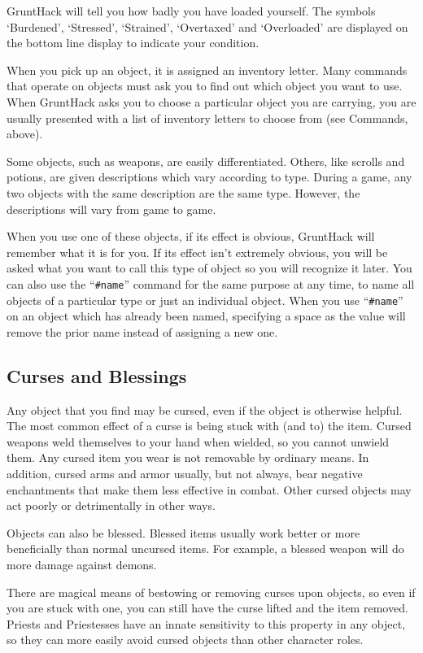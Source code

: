 GruntHack will tell you how badly you have loaded yourself.  The symbols
`Burdened', `Stressed', `Strained', `Overtaxed' and `Overloaded' are
displayed on the bottom line display to indicate your condition.

When you pick up an object, it is assigned an inventory letter.  Many
commands that operate on objects must ask you to find out which object
you want to use.  When GruntHack asks you to choose a particular object
you are carrying, you are usually presented with a list of inventory
letters to choose from (see Commands, above).

Some objects, such as weapons, are easily differentiated.  Others, like
scrolls and potions, are given descriptions which vary according to
type.  During a game, any two objects with the same description are
the same type.  However, the descriptions will vary from game to game.

When you use one of these objects, if its effect is obvious, GruntHack
will remember what it is for you.  If its effect isn't extremely
obvious, you will be asked what you want to call this type of object
so you will recognize it later.  You can also use the ``{\tt \#name}''
command for the same purpose at any time, to name all objects of a
particular type or just an individual object.
When you use ``{\tt \#name}'' on an object which has already been named,
specifying a space as the value will remove the prior name instead
of assigning a new one.
\subsection*{Curses and Blessings}

Any object that you find may be cursed, even if the object is
otherwise helpful.  The most common effect of a curse is being stuck
with (and to) the item.  Cursed weapons weld themselves to your hand
when wielded, so you cannot unwield them.  Any cursed item you wear
is not removable by ordinary means.  In addition, cursed arms and armor
usually, but not always, bear negative enchantments that make them
less effective in combat.  Other cursed objects may act poorly or
detrimentally in other ways.

Objects can also be blessed.  Blessed items usually work better or
more beneficially than normal uncursed items.  For example, a blessed
weapon will do more damage against demons.

There are magical means of bestowing or removing curses upon objects,
so even if you are stuck with one, you can still have the curse
lifted and the item removed.  Priests and Priestesses have an innate
sensitivity to this property in any object, so they can more easily avoid
cursed objects than other character roles.

